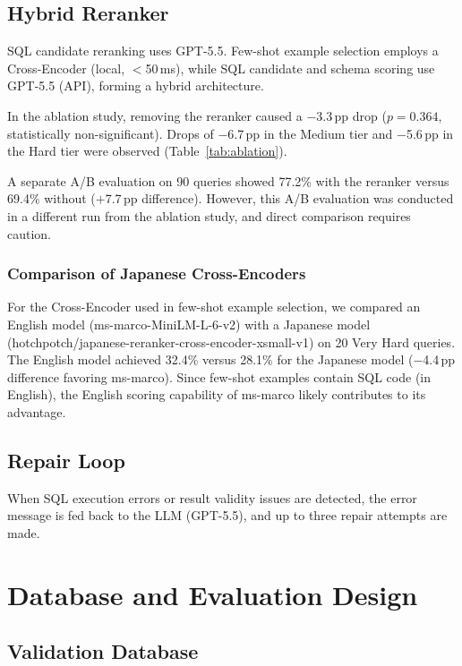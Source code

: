 \documentclass{npj-compt.mater}
\begin{document}
\subsection{Hybrid Reranker}

SQL candidate reranking uses GPT-5.5.
Few-shot example selection employs a Cross-Encoder (local, $<$50\,ms),
while SQL candidate and schema scoring use GPT-5.5 (API),
forming a hybrid architecture.

In the ablation study, removing the reranker caused a $-$3.3\,pp
drop ($p=0.364$, statistically non-significant).
Drops of $-$6.7\,pp in the Medium tier and $-$5.6\,pp in the Hard
tier were observed (Table~\ref{tab:ablation}).

A separate A/B evaluation on 90 queries showed 77.2\% with
the reranker versus 69.4\% without ($+$7.7\,pp difference).
However, this A/B evaluation was conducted in a different run from
the ablation study, and direct comparison requires caution.

\subsubsection{Comparison of Japanese Cross-Encoders}

For the Cross-Encoder used in few-shot example selection, we compared
an English model (ms-marco-MiniLM-L-6-v2) with a Japanese model
(hotchpotch/japanese-reranker-cross-encoder-xsmall-v1) on 20 Very Hard
queries.
The English model achieved 32.4\% versus 28.1\% for the Japanese model
($-$4.4\,pp difference favoring ms-marco).
Since few-shot examples contain SQL code (in English), the English
scoring capability of ms-marco likely contributes to its advantage.

\subsection{Repair Loop}
\label{sec:repair}

When SQL execution errors or result validity issues are detected,
the error message is fed back to the LLM (GPT-5.5), and up to
three repair attempts are made.

\section{Database and Evaluation Design}
\label{sec:evaluation}

\subsection{Validation Database}
\end{document}
